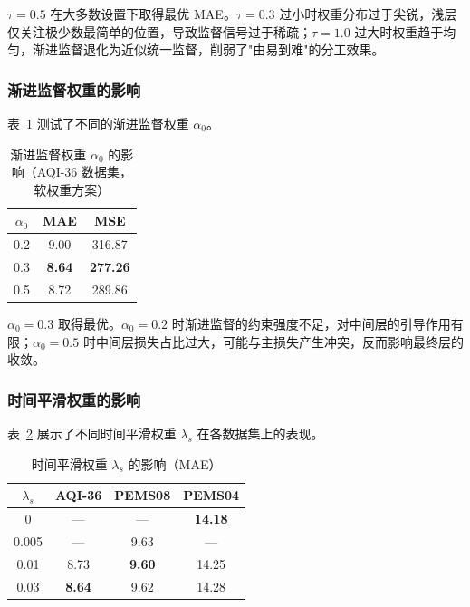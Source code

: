 $\tau=0.5$ 在大多数设置下取得最优 MAE。$\tau=0.3$ 过小时权重分布过于尖锐，浅层仅关注极少数最简单的位置，导致监督信号过于稀疏；$\tau=1.0$ 过大时权重趋于均匀，渐进监督退化为近似统一监督，削弱了"由易到难"的分工效果。

\subsubsection{渐进监督权重的影响}

表~\ref{tab:ablation_alpha} 测试了不同的渐进监督权重 $\alpha_0$。

\begin{table}[htbp]
\centering
\caption{\label{tab:ablation_alpha}渐进监督权重 $\alpha_0$ 的影响（AQI-36 数据集，软权重方案）}
\begin{tabular}{c|cc}
\toprule
$\alpha_0$ & MAE & MSE \\
\midrule
0.2 & 9.00 & 316.87 \\
0.3 & \textbf{8.64} & \textbf{277.26} \\
0.5 & 8.72 & 289.86 \\
\bottomrule
\end{tabular}
\end{table}

$\alpha_0=0.3$ 取得最优。$\alpha_0=0.2$ 时渐进监督的约束强度不足，对中间层的引导作用有限；$\alpha_0=0.5$ 时中间层损失占比过大，可能与主损失产生冲突，反而影响最终层的收敛。

\subsubsection{时间平滑权重的影响}

表~\ref{tab:ablation_smooth} 展示了不同时间平滑权重 $\lambda_s$ 在各数据集上的表现。

\begin{table}[htbp]
\centering
\caption{\label{tab:ablation_smooth}时间平滑权重 $\lambda_s$ 的影响（MAE）}
\begin{tabular}{c|ccc}
\toprule
$\lambda_s$ & AQI-36 & PEMS08 & PEMS04 \\
\midrule
0 & — & — & \textbf{14.18} \\
0.005 & — & 9.63 & — \\
0.01 & 8.73 & \textbf{9.60} & 14.25 \\
0.03 & \textbf{8.64} & 9.62 & 14.28 \\
\bottomrule
\end{tabular}
\end{table}


